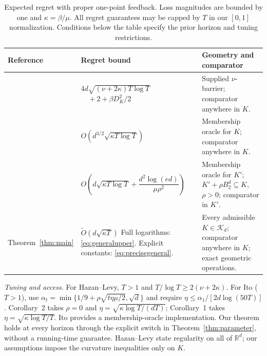 \documentclass[11pt]{article}
\numberwithin{equation}{section}
\newcommand{\R}{\mathbb R}
\newcommand{\cK}{\mathcal K}
\theoremstyle{definition}
\theoremstyle{remark}
\begin{document}
\begin{table}[!htbp]
\centering
\small
\setlength{\tabcolsep}{4pt}
\caption{Expected regret with proper one-point feedback. Loss magnitudes are
bounded by one and $\kappa=\beta/\mu$. All regret guarantees may be capped
by $T$ in our $[0,1]$ normalization. Conditions below the table specify the
prior horizon and tuning restrictions.}
\label{tab:comparison}
\begin{tabularx}{\textwidth}{@{}>{\raggedright\arraybackslash}p{}
 >{\raggedright\arraybackslash}p{}
 >{\raggedright\arraybackslash}X@{}}
\toprule
Reference & Regret bound & Geometry and comparator \\
\midrule
\citet[Thm.~10]{HL14}
& $4d\sqrt{(\nu+2\kappa)T\log T}$\newline
  $\quad+2+\beta D_K^2/2$
& Supplied $\nu$-barrier; comparator anywhere in $K$. \\[5pt]
\citet[Cor.~2]{Ito20}
& $O\!\left(d^{3/2}\sqrt{\kappa T\log T}\right)$
& Membership oracle for $K$; comparator anywhere in $K$. \\[5pt]
\citet[Cor.~1]{Ito20}
& $O\!\left(d\sqrt{\kappa T\log T}
           +\dfrac{d^2\log(ed)}{\mu\rho^2}\right)$
& Membership oracle for $K'$; $K'+\rho B_2^d\subseteq K$, $\rho>0$;
  comparator in $K'$. \\[5pt]
Theorem~\ref{thm:main}
& $\widetilde O(d\sqrt{\kappa T})$\newline
  Full logarithms: \eqref{eq:generalupper}.\newline
  Explicit constants: \eqref{eq:precisegeneral}.
& Every admissible $K\in\cK_d$; comparator anywhere in $K$;
  exact geometric operations. \\
\bottomrule
\end{tabularx}
\vspace{6pt}
\begin{minipage}{\textwidth}
\footnotesize
\textit{Tuning and access.}
For Hazan--Levy, $T>1$ and $T/\log T\geq2(\nu+2\kappa)$.
For Ito ($T>1$), use
$\alpha_t=\min\{1/9+\rho\sqrt{t\eta\mu/2},\sqrt d\}$ and require
$\eta\leq\alpha_1/[2d\log(50T)]$.
Corollary~2 takes $\rho=0$ and
$\eta=\sqrt{\kappa\log T/(dT)}$; Corollary~1 takes
$\eta=\sqrt{\kappa\log T/T}$.
Ito provides a membership-oracle implementation. Our theorem holds at every
horizon through the explicit switch in Theorem~\ref{thm:parameter}, without
a running-time guarantee. Hazan--Levy state regularity on all of $\R^d$;
our assumptions impose the curvature inequalities only on $K$.
\end{minipage}
\end{table}
\end{document}
